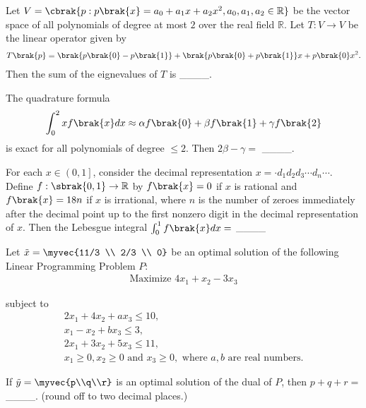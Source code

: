     \item Let $V = \cbrak{p : p\brak{x} = a_0 + a_1 x + a_2 x^2, a_0, a_1, a_2 \in \mathbb{R}}$ be the vector space of all polynomials of degree at most $2$ over the real field $\mathbb{R}$. Let $T:V \rightarrow V$ be the linear operator given by
        \begin{align*}
            T\brak{p} = \brak{p\brak{0} - p\brak{1}} + \brak{p\brak{0} + p\brak{1}}x + p\brak{0}x^2.
        \end{align*}
        Then the sum of the eignevalues of $T$ is \_\_\_\_.

    \item The quadrature formula
        \begin{align*}
            \int_0^2 x f \brak{x} dx \approx \alpha f \brak{0} + \beta f \brak{1} + \gamma f \brak{2}
        \end{align*}
        is exact for all polynomials of degree $\leq 2$. Then $2\beta - \gamma =$ \_\_\_\_.

    \item For each $x \in\left( 0,1 \right]$, consider the decimal representation $x = \cdot d_1 d_2 d_3 \cdots d_n \cdots$. Define $f : \sbrak{ 0,1 } \rightarrow \mathbb{R}$ by $f\brak{x} = 0$ if $x$ is rational and $f\brak{x} = 18n$ if $x$ is irrational, where $n$ is the number of zeroes immediately after the decimal point up to the first nonzero digit in the decimal representation of $x$. Then the Lebesgue integral $\int_0^1 f \brak{x} dx =$ \_\_\_\_

    \item \label{55} Let $\tilde{x} = \myvec{11/3 \\ 2/3 \\ 0}$ be an optimal solution of the following Linear Programming Problem $P:$
        \begin{align*}
            \text{Maximize } 4x_1 + x_2 - 3x_3
        \end{align*}

        subject to
        \begin{align*}
            2x_1 + 4x_2 + a x_3 \leq 10,\\
            x_1 - x_2 + bx_3 \leq 3,\\
            2x_1 + 3x_2 + 5x_3 \leq 11,\\
            x_1 \geq 0, x_2 \geq 0 \text{ and } x_3 \geq 0, \text{ where } a,b \text{ are real numbers.}
        \end{align*}

        If $\tilde{y} = \myvec{p\\q\\r}$ is an optimal solution of the dual of $P$, then $p+q+r=$ \_\_\_\_. (round off to two decimal places.)
